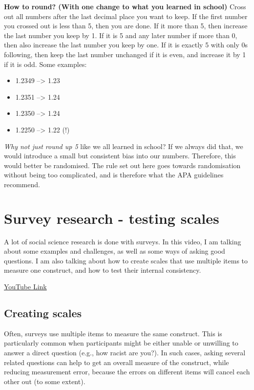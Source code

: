 \documentclass[
]{book}
\providecommand{\tightlist}{%
  \setlength{\itemsep}{0pt}\setlength{\parskip}{0pt}}
\begin{document}
\textbf{How to round? (With one change to what you learned in school)} Cross out all numbers after the last decimal place you want to keep. If the first number you crossed out is less than 5, then you are done. If it more than 5, then increase the last number you keep by 1. If it is 5 and any later number if more than 0, then also increase the last number you keep by one. If it is exactly 5 with only 0s following, then keep the last number unchanged if it is even, and increase it by 1 if it is odd. Some examples:

\begin{itemize}
\tightlist
\item
  1.2349 --\textgreater{} 1.23
\item
  1.2351 --\textgreater{} 1.24
\item
  1.2350 --\textgreater{} 1.24
\item
  1.2250 --\textgreater{} 1.22 (!)
\end{itemize}

\emph{Why not just round up 5} like we all learned in school? If we always did that, we would introduce a small but consistent bias into our numbers. Therefore, this would better be randomised. The rule set out here goes towards randomisation without being too complicated, and is therefore what the APA guidelines recommend.

\hypertarget{survey-research---testing-scales}{%
\chapter{Survey research - testing scales}\label{survey-research---testing-scales}}

A lot of social science research is done with surveys. In this video, I am talking about some examples and challenges, as well as some ways of asking good questions. I am also talking about how to create scales that use multiple items to measure one construct, and how to test their internal consistency.

\textcolor{blue}{\href{https://www.youtube.com/embed/fCbgi0KfWZc?rel=0&modestbranding=1&loop=1&playlist=sk7TT5qM5Hw}{YouTube Link}}

\hypertarget{creating-scales}{%
\section{Creating scales}\label{creating-scales}}

Often, surveys use multiple items to measure the same construct. This is particularly common when participants might be either unable or unwilling to answer a direct question (e.g., how racist are you?). In such cases, asking several related questions can help to get an overall measure of the construct, while reducing measurement error, because the errors on different items will cancel each other out (to some extent).
\end{document}
